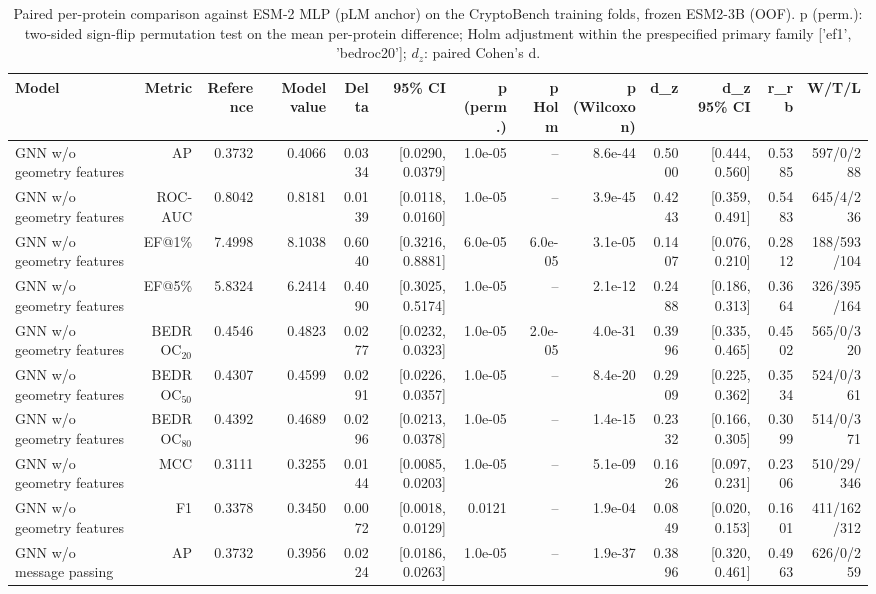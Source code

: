 \begin{table}[t]
\centering
\small
\caption{Paired per-protein comparison against ESM-2 MLP (pLM anchor) on the CryptoBench training folds, frozen ESM2-3B (OOF). p (perm.): two-sided sign-flip permutation test on the mean per-protein difference; Holm adjustment within the prespecified primary family ['ef1', 'bedroc20']; $d_z$: paired Cohen's d.}
\label{tab:table_paired_vs_base_plm}
\begin{tabular}{lrrrrrrrrrrrr}
\toprule
Model & Metric & Reference & Model value & Delta & 95\% CI & p (perm.) & p Holm & p (Wilcoxon) & d\_z & d\_z 95\% CI & r\_rb & W/T/L \\
\midrule
GNN w/o geometry features & AP & 0.3732 & 0.4066 & 0.0334 & [0.0290, 0.0379] & 1.0e-05 & -- & 8.6e-44 & 0.5000 & [0.444, 0.560] & 0.5385 & 597/0/288 \\
GNN w/o geometry features & ROC-AUC & 0.8042 & 0.8181 & 0.0139 & [0.0118, 0.0160] & 1.0e-05 & -- & 3.9e-45 & 0.4243 & [0.359, 0.491] & 0.5483 & 645/4/236 \\
GNN w/o geometry features & EF@1\% & 7.4998 & 8.1038 & 0.6040 & [0.3216, 0.8881] & 6.0e-05 & 6.0e-05 & 3.1e-05 & 0.1407 & [0.076, 0.210] & 0.2812 & 188/593/104 \\
GNN w/o geometry features & EF@5\% & 5.8324 & 6.2414 & 0.4090 & [0.3025, 0.5174] & 1.0e-05 & -- & 2.1e-12 & 0.2488 & [0.186, 0.313] & 0.3664 & 326/395/164 \\
GNN w/o geometry features & BEDROC$_{20}$ & 0.4546 & 0.4823 & 0.0277 & [0.0232, 0.0323] & 1.0e-05 & 2.0e-05 & 4.0e-31 & 0.3996 & [0.335, 0.465] & 0.4502 & 565/0/320 \\
GNN w/o geometry features & BEDROC$_{50}$ & 0.4307 & 0.4599 & 0.0291 & [0.0226, 0.0357] & 1.0e-05 & -- & 8.4e-20 & 0.2909 & [0.225, 0.362] & 0.3534 & 524/0/361 \\
GNN w/o geometry features & BEDROC$_{80}$ & 0.4392 & 0.4689 & 0.0296 & [0.0213, 0.0378] & 1.0e-05 & -- & 1.4e-15 & 0.2332 & [0.166, 0.305] & 0.3099 & 514/0/371 \\
GNN w/o geometry features & MCC & 0.3111 & 0.3255 & 0.0144 & [0.0085, 0.0203] & 1.0e-05 & -- & 5.1e-09 & 0.1626 & [0.097, 0.231] & 0.2306 & 510/29/346 \\
GNN w/o geometry features & F1 & 0.3378 & 0.3450 & 0.0072 & [0.0018, 0.0129] & 0.0121 & -- & 1.9e-04 & 0.0849 & [0.020, 0.153] & 0.1601 & 411/162/312 \\
GNN w/o message passing & AP & 0.3732 & 0.3956 & 0.0224 & [0.0186, 0.0263] & 1.0e-05 & -- & 1.9e-37 & 0.3896 & [0.320, 0.461] & 0.4963 & 626/0/259 \\

\end{tabular}
\end{table}

